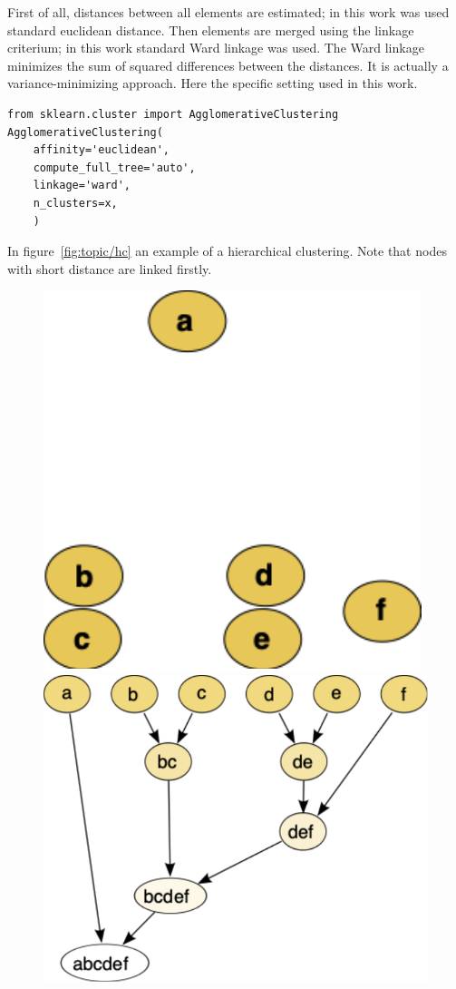 First of all, distances between all elements are estimated; in this work was used standard euclidean distance. Then elements are merged using the linkage criterium; in this work standard Ward linkage was used. The Ward linkage minimizes the sum of squared differences between the distances. It is actually a variance-minimizing approach. Here the specific setting used in this work.
\begin{lstlisting}[style=mypython]
from sklearn.cluster import AgglomerativeClustering
AgglomerativeClustering(
    affinity='euclidean',
    compute_full_tree='auto',
    linkage='ward',
    n_clusters=x,
    )
\end{lstlisting}
In figure~\ref{fig:topic/hc} an example of a hierarchical clustering. Note that nodes with short distance are linked firstly.
\begin{figure}[htb!]
	\centering
	\begin{minipage}{0.35\textwidth}
		\includegraphics[width=0.8\linewidth]{pictures/topic/clusters.pdf}
	\end{minipage}
\hspace{3mm}
	\begin{minipage}{0.35\textwidth}
			\includegraphics[width=0.9\linewidth]{pictures/topic/hierarchical_clustering_simple_diagram.pdf}

\end{minipage}
\end{figure}
